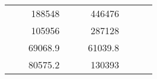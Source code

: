 \begin{table}[H]
\begin{tabular}{|ccrccrccc}
\multicolumn{1}{|c|}{\cellcolor[HTML]{FFFFC7}}                                & \multicolumn{1}{c|}{\cellcolor[HTML]{DDFDFF}}                      & \multicolumn{1}{r|}{\cellcolor[HTML]{DAE8FC}188548}    & \multicolumn{1}{c|}{\cellcolor[HTML]{FFFFC7}}                                & \multicolumn{1}{c|}{\cellcolor[HTML]{DDFDFF}}                       & \multicolumn{1}{r|}{\cellcolor[HTML]{DDFDFF}446476}    &                                                                              &                                                                    &                                                        \\ \cline{3-3} \cline{6-6}
\multicolumn{1}{|c|}{\cellcolor[HTML]{FFFFC7}}                                & \multicolumn{1}{c|}{\cellcolor[HTML]{DDFDFF}}                      & \multicolumn{1}{r|}{\cellcolor[HTML]{DDFDFF}105956}    & \multicolumn{1}{c|}{\cellcolor[HTML]{FFFFC7}}                                & \multicolumn{1}{c|}{\cellcolor[HTML]{DDFDFF}}                       & \multicolumn{1}{r|}{\cellcolor[HTML]{DAE8FC}287128}    &                                                                              &                                                                    &                                                        \\ \cline{3-3} \cline{6-6}
\multicolumn{1}{|c|}{\cellcolor[HTML]{FFFFC7}}                                & \multicolumn{1}{c|}{\cellcolor[HTML]{DDFDFF}}                      & \multicolumn{1}{r|}{\cellcolor[HTML]{DAE8FC}69068.9}   & \multicolumn{1}{c|}{\cellcolor[HTML]{FFFFC7}}                                & \multicolumn{1}{c|}{\cellcolor[HTML]{DDFDFF}}                       & \multicolumn{1}{r|}{\cellcolor[HTML]{DDFDFF}61039.8}   &                                                                              &                                                                    &                                                        \\ \cline{3-3} \cline{6-6}
\multicolumn{1}{|c|}{\cellcolor[HTML]{FFFFC7}}                                & \multicolumn{1}{c|}{\cellcolor[HTML]{DDFDFF}}                      & \multicolumn{1}{r|}{\cellcolor[HTML]{DDFDFF}80575.2}   & \multicolumn{1}{c|}{\cellcolor[HTML]{FFFFC7}}                                & \multicolumn{1}{c|}{\cellcolor[HTML]{DDFDFF}}                       & \multicolumn{1}{r|}{\cellcolor[HTML]{DAE8FC}130393}    &                                                                              &                                                                    &                                                        \\ \cline{3-3} \cline{6-6}

\end{tabular}
\end{table}
